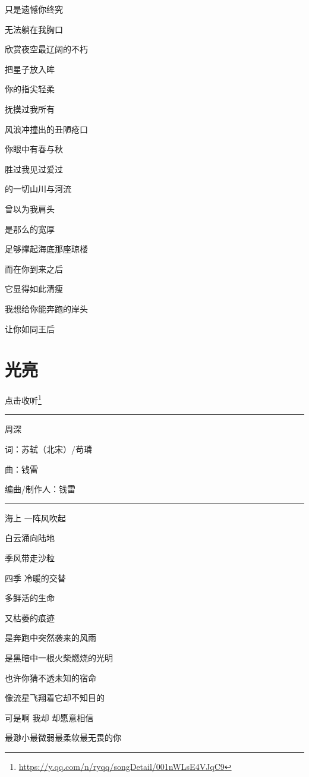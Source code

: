 \documentclass[]{ctexbook}
\renewcommand{\href}[2]{#2\footnote{\url{#1}}}
\begin{document}
只是遗憾你终究

无法躺在我胸口

欣赏夜空最辽阔的不朽

把星子放入眸

你的指尖轻柔

抚摸过我所有

风浪冲撞出的丑陋疮口

你眼中有春与秋

胜过我见过爱过

的一切山川与河流

曾以为我肩头

是那么的宽厚

足够撑起海底那座琼楼

而在你到来之后

它显得如此清瘦

我想给你能奔跑的岸头

让你如同王后

\section*{光亮}\label{silver-linings}


\href{https://y.qq.com/n/ryqq/songDetail/001nWLsE4VJqC9}{点击收听}

\begin{center}\rule{0.5\linewidth}{0.5pt}\end{center}

周深

词：苏轼（北宋）/苟璘

曲：钱雷

编曲/制作人：钱雷

\begin{center}\rule{0.5\linewidth}{0.5pt}\end{center}

海上 一阵风吹起

白云涌向陆地

季风带走沙粒

四季 冷暖的交替

多鲜活的生命

又枯萎的痕迹

是奔跑中突然袭来的风雨

是黑暗中一根火柴燃烧的光明

也许你猜不透未知的宿命

像流星飞翔着它却不知目的

可是啊 我却 却愿意相信

最渺小最微弱最柔软最无畏的你
\end{document}
